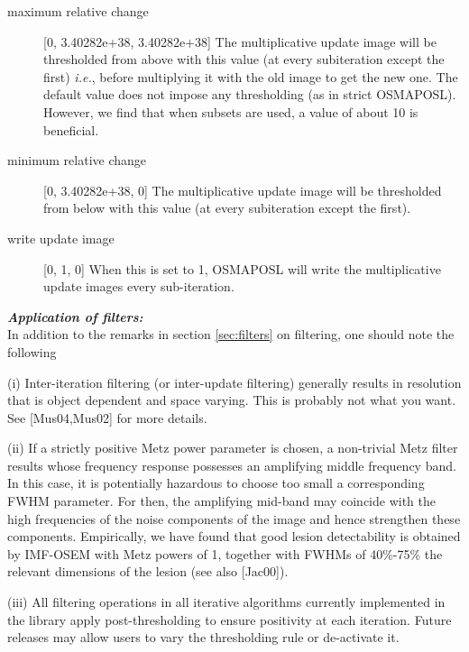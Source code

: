 \documentclass{article}
\begin{document}
\begin{description}
\item[maximum relative change] [0, 3.40282e+38, 3.40282e+38{]}
The multiplicative update image will be thresholded from above 
with this value (at every subiteration except the first) \textit{i.e.}, 
before multiplying it with the old image to get the new one. 
The default value does not impose any thresholding (as in strict 
OSMAPOSL). However, we find that when subsets are used, a value 
of about 10 is beneficial.


\item[minimum relative change] [0, 3.40282e+38, 0{]}
The multiplicative update image will be thresholded from below 
with this value (at every subiteration except the first).


\item[write update image] [0, 1, 0{]}
When this is set to 1, OSMAPOSL will write the multiplicative 
update images every sub-iteration.

\end{description}


{
}
\label{sec:OSMAPOSLtechnotes}

\textbf{\textit{Application of filters:}} \\
In addition to the remarks in section \ref{sec:filters} on filtering, 
one should 
note the following


(i) Inter-iteration filtering (or inter-update filtering) generally 
results in resolution that is object dependent and space varying. 
This is probably not what you want. See [Mus04,Mus02] for more 
details.



(ii) If a strictly positive Metz power parameter is chosen, a 
non-trivial Metz filter results whose frequency response possesses 
an amplifying middle frequency band. In this case, it is potentially 
hazardous to choose too small a corresponding FWHM parameter. 
For then, the amplifying mid-band may coincide with the high 
frequencies of the noise components of the image and hence strengthen 
these components. Empirically, we have found that good lesion 
detectability is obtained by IMF-OSEM with Metz powers of 1, 
together with FWHMs of 40\%-75\% the relevant dimensions of the 
lesion (see also [Jac00]).



(iii) All filtering operations in all iterative algorithms currently 
implemented in the library apply post-thresholding 
to ensure positivity at each iteration. Future 
releases may allow users to vary the thresholding rule or de-activate 
it.
\end{document}
